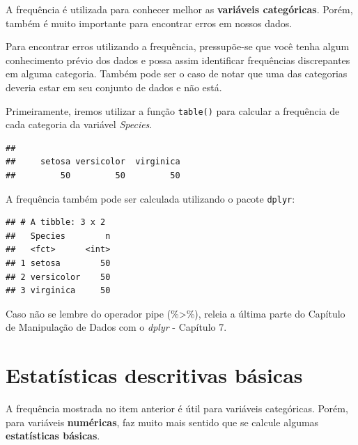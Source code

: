 \documentclass[
]{book}
\newenvironment{Shaded}{\begin{snugshade}}{\end{snugshade}}
\newcommand{\KeywordTok}[1]{\textcolor[rgb]{0.13,0.29,0.53}{\textbf{#1}}}
\newcommand{\NormalTok}[1]{#1}
\newcommand{\OperatorTok}[1]{\textcolor[rgb]{0.81,0.36,0.00}{\textbf{#1}}}
\newcommand{\StringTok}[1]{\textcolor[rgb]{0.31,0.60,0.02}{#1}}
\begin{document}
A frequência é utilizada para conhecer melhor as \textbf{variáveis
categóricas}. Porém, também é muito importante para encontrar erros em
nossos dados.

Para encontrar erros utilizando a frequência, pressupõe-se que você
tenha algum conhecimento prévio dos dados e possa assim identificar
frequências discrepantes em alguma categoria. Também pode ser o caso de
notar que uma das categorias deveria estar em seu conjunto de dados e
não está.

Primeiramente, iremos utilizar a função \texttt{table()} para calcular a
frequência de cada categoria da variável \emph{Species}.

\begin{Shaded}
\end{Shaded}

\begin{verbatim}
## 
##     setosa versicolor  virginica 
##         50         50         50
\end{verbatim}

A frequência também pode ser calculada utilizando o pacote
\texttt{dplyr}:

\begin{Shaded}
\end{Shaded}

\begin{verbatim}
## # A tibble: 3 x 2
##   Species        n
##   <fct>      <int>
## 1 setosa        50
## 2 versicolor    50
## 3 virginica     50
\end{verbatim}

Caso não se lembre do operador pipe (\%\textgreater\%), releia a última
parte do Capítulo de Manipulação de Dados com o \emph{dplyr} - Capítulo
7.

\hypertarget{estatuxedsticas-descritivas-buxe1sicas}{%
\section{Estatísticas descritivas
básicas}\label{estatuxedsticas-descritivas-buxe1sicas}}

A frequência mostrada no item anterior é útil para variáveis
categóricas. Porém, para variáveis \textbf{numéricas}, faz muito mais
sentido que se calcule algumas \textbf{estatísticas básicas}.
\end{document}
